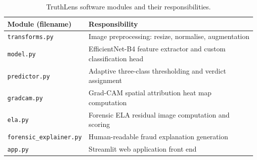\documentclass[12pt,a4paper,oneside]{report}
\begin{document}
\begin{table}[H]
\centering
\caption{TruthLens software modules and their responsibilities.}
\label{tab:modules}
\renewcommand{\arraystretch}{1.3}
\begin{tabularx}{\textwidth}{lX}
\toprule
\textbf{Module (filename)} & \textbf{Responsibility} \\
\midrule
\texttt{transforms.py}          & Image preprocessing: resize, normalise, augmentation \\
\texttt{model.py}               & EfficientNet-B4 feature extractor and custom classification head \\
\texttt{predictor.py}           & Adaptive three-class thresholding and verdict assignment \\
\texttt{gradcam.py}             & Grad-CAM spatial attribution heat map computation \\
\texttt{ela.py}                 & Forensic ELA residual image computation and scoring \\
\texttt{forensic\_explainer.py} & Human-readable fraud explanation generation \\
\texttt{app.py}                 & Streamlit web application front end \\
\bottomrule
\end{tabularx}
\end{table}
\end{document}
